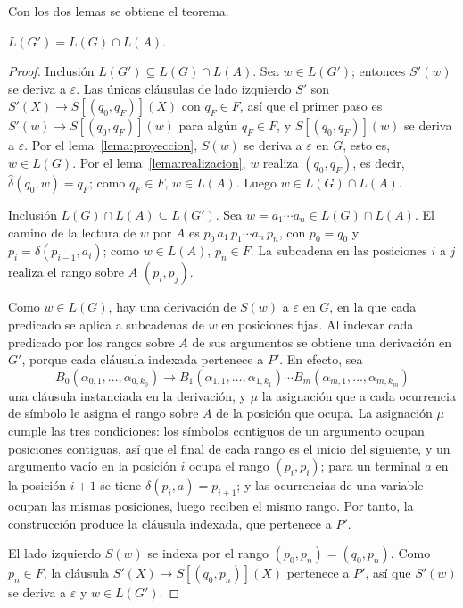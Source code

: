 Con los dos lemas se obtiene el teorema.

\begin{teorema}\label{teo:correctitud}
$L(G') = L(G) \cap L(A)$.
\end{teorema}

\begin{proof}
Inclusión $L(G') \subseteq L(G) \cap L(A)$. Sea $w \in L(G')$;
entonces $S'(w)$ se deriva a $\varepsilon$. Las únicas cláusulas de
lado izquierdo $S'$ son $S'(X) \to S[(q_0, q_F)](X)$ con $q_F \in F$, así que el
primer paso es $S'(w) \to S[(q_0, q_F)](w)$ para algún $q_F \in F$, y
$S[(q_0, q_F)](w)$ se deriva a $\varepsilon$. Por el
lema~\ref{lema:proyeccion}, $S(w)$ se deriva a $\varepsilon$ en $G$, esto
es, $w \in L(G)$. Por el lema~\ref{lema:realizacion}, $w$ realiza
$(q_0, q_F)$, es decir, $\hat\delta(q_0, w) = q_F$; como $q_F \in F$,
$w \in L(A)$. Luego $w \in L(G) \cap L(A)$.

Inclusión $L(G) \cap L(A) \subseteq L(G')$. Sea
$w = a_1 \cdots a_n \in L(G) \cap L(A)$. El camino de la lectura de $w$
por $A$ es $p_0\,a_1\,p_1 \cdots a_n\,p_n$, con $p_0 = q_0$ y
$p_i = \delta(p_{i-1}, a_i)$; como $w \in L(A)$, $p_n \in F$. La subcadena
en las posiciones $i$ a $j$ realiza el rango sobre $A$ $(p_i, p_j)$.

Como $w \in L(G)$, hay una derivación de $S(w)$ a $\varepsilon$ en $G$,
en la que cada predicado se aplica a subcadenas de $w$ en posiciones
fijas. Al indexar cada predicado por los rangos sobre $A$ de sus
argumentos se obtiene una derivación en $G'$, porque cada cláusula
indexada pertenece a $P'$. En efecto, sea
\[
  B_0(\alpha_{0,1}, \ldots, \alpha_{0,k_0}) \to B_1(\alpha_{1,1}, \ldots, \alpha_{1,k_1}) \cdots B_m(\alpha_{m,1}, \ldots, \alpha_{m,k_m})
\]
una cláusula instanciada en la
derivación, y $\mu$ la asignación que a cada ocurrencia de símbolo le
asigna el rango sobre $A$ de la posición que ocupa. La asignación $\mu$
cumple las tres condiciones: los símbolos contiguos de un argumento
ocupan posiciones contiguas, así que el final de cada rango es el inicio
del siguiente, y un argumento vacío en la posición $i$ ocupa el rango
$(p_i, p_i)$; para un terminal $a$ en la posición $i{+}1$ se
tiene $\delta(p_i, a) = p_{i+1}$; y las ocurrencias de una
variable ocupan las mismas posiciones, luego reciben el mismo rango. Por tanto, la construcción produce la cláusula
indexada, que pertenece a $P'$.

El lado izquierdo $S(w)$ se indexa por el rango $(p_0, p_n) =
(q_0, p_n)$. Como $p_n \in F$, la cláusula
$S'(X) \to S[(q_0, p_n)](X)$ pertenece a $P'$, así que $S'(w)$ se
deriva a $\varepsilon$ y $w \in L(G')$.
\end{proof}

